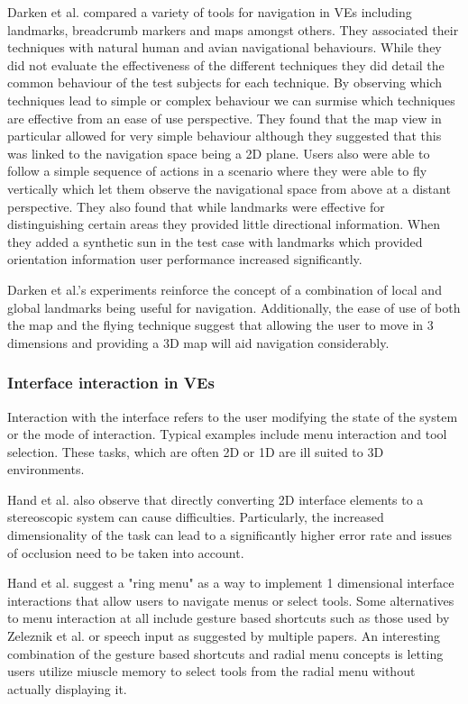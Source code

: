 \documentclass{sig-alternate-05-2015}
\begin{document}
Darken et al. compared a variety of tools for navigation in VEs including landmarks, breadcrumb markers and maps amongst others\cite{Darken1993}. They associated their techniques with natural human and avian  navigational behaviours. While they did not evaluate the effectiveness of the different techniques they did detail the common behaviour of the test subjects for each technique. By observing which techniques lead to simple or complex behaviour we can surmise which techniques are effective from an ease of use perspective. They found that the map view in particular allowed for very simple behaviour although they suggested that this was linked to the navigation space being a 2D plane. Users also were able to follow a simple sequence of actions in a scenario where they were able to fly vertically which let them observe the navigational space from above at a distant perspective. They also found that while landmarks were effective for distinguishing certain areas they provided little directional information. When they added a synthetic sun in the test case with landmarks which provided orientation information user performance increased significantly.

Darken et al.'s experiments reinforce the concept of a combination of local and global landmarks being useful for navigation.\cite{Darken1993} Additionally, the ease of use of both the map and the flying technique suggest that allowing the user to move in 3 dimensions and providing a 3D map will aid navigation considerably. 
\subsubsection{Interface interaction in VEs}
 Interaction with the interface refers to the user modifying the state of the system or the mode of interaction\cite{Bowman2001}. Typical examples include menu interaction and tool selection. These tasks, which are often 2D or 1D are ill suited to 3D environments\cite{Bowman2001, Hand1997}.
 
 Hand et al. also observe that directly converting 2D interface elements to a stereoscopic system can cause difficulties.\cite{Hand1997} Particularly, the increased dimensionality of the task can lead to a significantly higher error rate and issues of occlusion need to be taken into account.
 
 Hand et al. suggest a "ring menu" as a way to implement 1 dimensional interface interactions that allow users to navigate menus or select tools.\cite{Hand1997} Some alternatives to menu interaction at all include gesture based shortcuts such as those used by Zeleznik et al.\cite{Zeleznik2007} or speech input as suggested by multiple papers. \cite{VanDam1997,Bowman2001,Hand1997} An interesting combination of the gesture based shortcuts and radial menu concepts is letting users utilize miuscle memory to select tools from the radial menu without actually displaying it.\cite{Kurtenbach1993}
 
\end{document}
